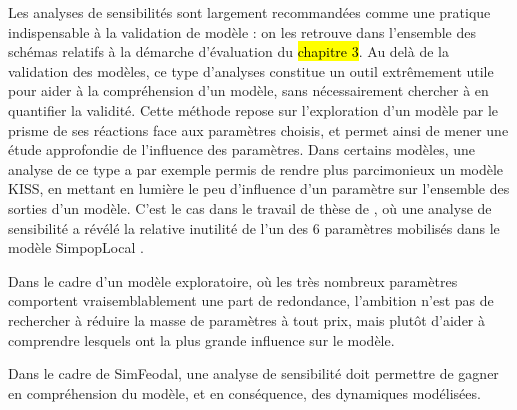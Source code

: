 Les analyses de sensibilités sont largement recommandées comme une pratique indispensable à la validation de modèle : on les retrouve dans l'ensemble des schémas relatifs à la démarche d'évaluation du \hl{chapitre 3}.
Au delà de la validation des modèles, ce type d'analyses constitue un outil extrêmement utile pour aider à la compréhension d'un modèle, sans nécessairement chercher à en quantifier la validité.
Cette méthode repose sur l'exploration d'un modèle par le prisme de ses réactions face aux paramètres choisis, et permet ainsi de mener une étude approfondie de l'influence des paramètres.
Dans certains modèles, une analyse de ce type a par exemple permis de rendre plus parcimonieux un modèle KISS, en mettant en lumière le peu d'influence d'un paramètre sur l'ensemble des sorties d'un modèle.
C'est le cas dans le travail de thèse de , où une analyse de sensibilité a révélé la relative inutilité de l'un des 6 paramètres mobilisés dans le modèle SimpopLocal \autocite[224-225]{schmitt_modelisation_2014}.

Dans le cadre d'un modèle exploratoire, où les très nombreux paramètres comportent vraisemblablement une part de redondance, l'ambition n'est pas de rechercher à réduire la masse de paramètres à tout prix, mais plutôt d'aider à comprendre lesquels ont la plus grande influence sur le modèle.

Dans le cadre de SimFeodal, une analyse de sensibilité doit permettre de gagner en compréhension du modèle, et en conséquence, des dynamiques modélisées.


